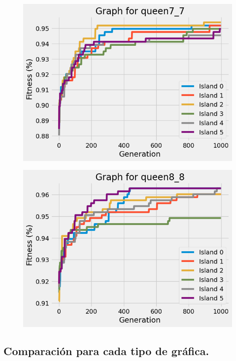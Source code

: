 \documentclass{article}
\begin{document}
\begin{multicols}{2}
\begin{figure}[H]
    \includegraphics[scale=0.45]{imgs/convergence/queen7_7_evolution.png}
\end{figure}
\begin{figure}[H]
    \centering
    \includegraphics[scale=0.45]{imgs/convergence/queen8_8_evolution.png}
\end{figure}
\end{multicols}
\subsection{Comparación para cada tipo de gráfica.}
\end{document}
